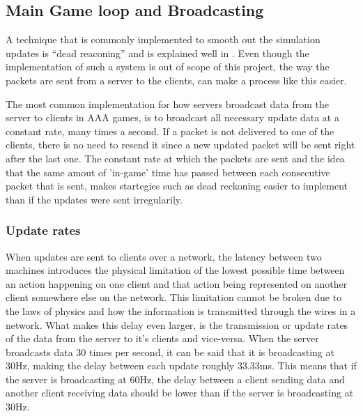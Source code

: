 \subsection{Main Game loop and Broadcasting}
A technique that is commonly implemented to smooth out the simulation updates is ``dead reaconing'' and is explained well in . Even though the implementation of such a system is out of scope of this project, the way the packets are sent from a server to the clients, can make a process like this easier.

The most common implementation for how servers broadcast data from the server to clients in AAA games, is to broadcast all necessary update data at a constant rate, many times a second. If a packet is not delivered to one of the clients, there is no need to resend it since a new updated packet will be sent right after the last one. The constant rate at which the packets are sent and the idea that the same amout of 'in-game' time has passed between each consecutive packet that is sent, makes startegies such as dead reckoning easier to implement than if the updates were sent irregularily.

\subsubsection{Update rates}
When updates are sent to clients over a network, the latency between two machines introduces the physical limitation of the lowest possible time between an action happening on one client and that action being represented on another client somewhere else on the network. This limitation cannot be broken due to the laws of physics and how the information is transmitted through the wires in a network. What makes this delay even larger, is the transmission or update rates of the data from the server to it's clients and vice-versa. When the server broadcasts data 30 times per second, it can be said that it is broadcasting at 30Hz, making the delay between each update roughly 33.33ms. This means that if the server is broadcasting at 60Hz, the delay between a client sending data and another client receiving data should be lower than if the server is broadcasting at 30Hz.

